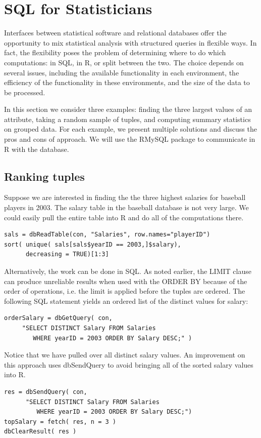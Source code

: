 \section{SQL for Statisticians}\label{dbms:sect:Smarties} 

Interfaces between statistical software and relational databases  
offer the opportunity to mix statistical analysis with
structured queries in flexible ways.
In fact, the flexibility poses the problem of determining 
where to do which computations: in SQL, in R, or split between
the two.
The choice depends on several issues, including
the available functionality in each environment,
the efficiency of the functionality in these environments, 
and the size of the data to be processed.

In this section we consider three examples: finding 
the three largest values of an attribute,
taking a random sample of tuples, and computing summary statistics
on grouped data. For each example, we present multiple solutions and
discuss the pros and cons of approach. 
We will use the RMySQL package to communicate in R with 
the database. 

\subsection{Ranking tuples}
Suppose we are interested in finding the the three highest 
salaries for baseball players in 2003.
The salary table in the baseball database is not very large.
We could easily pull the entire table into R 
and do all of the computations there.
\begin{verbatim}
sals = dbReadTable(con, "Salaries", row.names="playerID")
sort( unique( sals[sals$yearID == 2003,]$salary), 
      decreasing = TRUE)[1:3]
\end{verbatim}

Alternatively, the work can be done in SQL. As noted earlier,
the LIMIT clause can produce unreliable results when used with the
ORDER BY because of the order of operations, i.e. the limit is applied
before the tuples are ordered.  
The following SQL statement yields an ordered list of the distinct
values for salary:
\begin{verbatim}
orderSalary = dbGetQuery( con, 
     "SELECT DISTINCT Salary FROM Salaries 
        WHERE yearID = 2003 ORDER BY Salary DESC;" )
\end{verbatim}
Notice that we have pulled over all distinct salary values. 
An improvement on this approach uses dbSendQuery to avoid bringing
all of the sorted salary values into R.
\begin{verbatim}
res = dbSendQuery( con, 
      "SELECT DISTINCT Salary FROM Salaries 
         WHERE yearID = 2003 ORDER BY Salary DESC;")
topSalary = fetch( res, n = 3 ) 
dbClearResult( res ) 
\end{verbatim}

